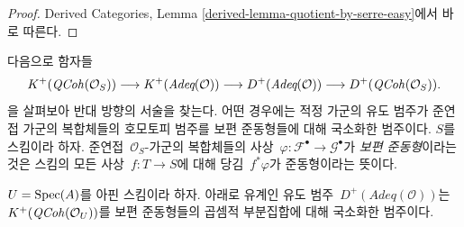 \begin{proof}
Derived Categories, Lemma
\ref{derived-lemma-quotient-by-serre-easy}에서 바로 따른다.
\end{proof}

\noindent
다음으로 함자들
$$
K^+(\mathit{QCoh}(\mathcal{O}_S))
\longrightarrow
K^+(\textit{Adeq}(\mathcal{O}))
\longrightarrow
D^+(\textit{Adeq}(\mathcal{O}))
\longrightarrow
D^+(\mathit{QCoh}(\mathcal{O}_S)).
$$
을 살펴보아 반대 방향의 서술을 찾는다. 어떤 경우에는 적정 가군의
유도 범주가 준연접 가군의 복합체들의 호모토피 범주를 보편
준동형들에 대해 국소화한 범주이다. $S$를 스킴이라 하자.
준연접\  $\mathcal{O}_S$-가군의 복합체들의 사상\ 
$\varphi : \mathcal{F}^\bullet \to \mathcal{G}^\bullet$가
{\it 보편 준동형}이라는 것은 스킴의 모든 사상\  $f : T \to S$에
대해 당김\  $f^*\varphi$가 준동형이라는 뜻이다.

\begin{lemma}
\label{lemma-describe-Dplus-adequate}
$U = \mathop{\mathrm{Spec}}(A)$를 아핀 스킴이라 하자. 아래로 유계인 유도 범주\ 
$D^+(\textit{Adeq}(\mathcal{O}))$는\ 
$K^+(\mathit{QCoh}(\mathcal{O}_U))$를 보편 준동형들의 곱셈적 부분집합에
대해 국소화한 범주이다.
\end{lemma}

